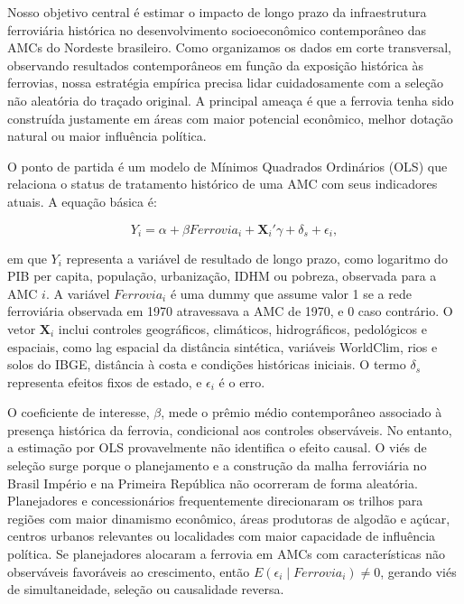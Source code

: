 \documentclass[12pt,a4paper]{article}
\begin{document}
Nosso objetivo central é estimar o impacto de longo prazo da infraestrutura ferroviária histórica no desenvolvimento socioeconômico contemporâneo das AMCs do Nordeste brasileiro. Como organizamos os dados em corte transversal, observando resultados contemporâneos em função da exposição histórica às ferrovias, nossa estratégia empírica precisa lidar cuidadosamente com a seleção não aleatória do traçado original. A principal ameaça é que a ferrovia tenha sido construída justamente em áreas com maior potencial econômico, melhor dotação natural ou maior influência política.


O ponto de partida é um modelo de Mínimos Quadrados Ordinários (OLS) que relaciona o status de tratamento histórico de uma AMC com seus indicadores atuais. A equação básica é:

\begin{equation}
Y_i = \alpha + \beta Ferrovia_i + \mathbf{X}_i'\gamma + \delta_s + \epsilon_i,
\end{equation}

\noindent em que $Y_i$ representa a variável de resultado de longo prazo, como logaritmo do PIB per capita, população, urbanização, IDHM ou pobreza, observada para a AMC $i$. A variável $Ferrovia_i$ é uma dummy que assume valor 1 se a rede ferroviária observada em 1970 atravessava a AMC de 1970, e 0 caso contrário. O vetor $\mathbf{X}_i$ inclui controles geográficos, climáticos, hidrográficos, pedológicos e espaciais, como lag espacial da distância sintética, variáveis WorldClim, rios e solos do IBGE, distância à costa e condições históricas iniciais. O termo $\delta_s$ representa efeitos fixos de estado, e $\epsilon_i$ é o erro.

O coeficiente de interesse, $\beta$, mede o prêmio médio contemporâneo associado à presença histórica da ferrovia, condicional aos controles observáveis. No entanto, a estimação por OLS provavelmente não identifica o efeito causal. O viés de seleção surge porque o planejamento e a construção da malha ferroviária no Brasil Império e na Primeira República não ocorreram de forma aleatória. Planejadores e concessionários frequentemente direcionaram os trilhos para regiões com maior dinamismo econômico, áreas produtoras de algodão e açúcar, centros urbanos relevantes ou localidades com maior capacidade de influência política. Se planejadores alocaram a ferrovia em AMCs com características não observáveis favoráveis ao crescimento, então $E(\epsilon_i \mid Ferrovia_i) \neq 0$, gerando viés de simultaneidade, seleção ou causalidade reversa.
\end{document}
